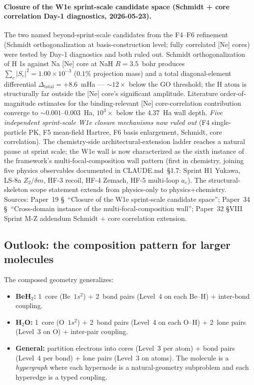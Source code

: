 \documentclass[aps,pra,twocolumn,superscriptaddress,longbibliography,floatfix]{revtex4-2}
\begin{document}
\paragraph{Closure of the W1e sprint-scale candidate space (Schmidt +
core correlation Day-1 diagnostics, 2026-05-23).} The two named
beyond-sprint-scale candidates from the F4--F6 refinement (Schmidt
orthogonalization at basis-construction level; fully correlated
[Ne] cores) were tested by Day-1 diagnostics and both ruled out.
Schmidt orthogonalization of H 1s against Na [Ne] core at NaH
$R = 3.5$~bohr produces $\sum_c |S_c|^2 = 1.00 \times 10^{-3}$
($0.1\%$ projection mass) and a total diagonal-element differential
$\Delta_\text{total} = +8.6$~mHa --- $\sim 12\times$ below the GO
threshold; the H atom is structurally far outside the [Ne] core's
significant amplitude. Literature order-of-magnitude estimates for
the binding-relevant [Ne] core-correlation contribution converge to
$\sim 0.001$--$0.003$~Ha, $10^3\times$ below the 4.37~Ha wall depth.
\emph{Five independent sprint-scale W1e closure mechanisms now ruled
out} (F4 single-particle PK, F5 mean-field Hartree, F6 basis
enlargement, Schmidt, core correlation). The chemistry-side
architectural-extension ladder reaches a natural pause at sprint
scale; the W1e wall is now characterized as the sixth instance of
the framework's multi-focal-composition wall pattern (first in
chemistry, joining five physics observables documented in
CLAUDE.md~\S1.7: Sprint H1 Yukawa, LS-8a $Z_2/\delta m$, HF-3 recoil,
HF-4 Zemach, HF-5 multi-loop $a_e$). The structural-skeleton scope
statement extends from physics-only to physics+chemistry. Sources:
Paper~19 \S~``Closure of the W1e sprint-scale candidate space'';
Paper~34 \S~``Cross-domain instance of the multi-focal-composition wall''; Paper~32
\S VIII Sprint M-Z addendum Schmidt + core correlation extension.

\subsection{Outlook: the composition pattern for larger molecules}
\label{sec:outlook}

The composed geometry generalizes:
\begin{itemize}
  \item \textbf{BeH$_2$:} 1~core (Be~$1s^2$) + 2~bond pairs (Level~4
    on each Be--H) + inter-bond coupling.
  \item \textbf{H$_2$O:} 1~core (O~$1s^2$) + 2~bond pairs (Level~4 on
    each O--H) + 2~lone pairs (Level~3 on O) + inter-pair coupling.
  \item \textbf{General:} partition electrons into cores (Level~3 per
    atom) + bond pairs (Level~4 per bond) + lone pairs (Level~3 on atoms).
    The molecule is a \emph{hypergraph} where each hypernode is a
    natural-geometry subproblem and each hyperedge is a typed coupling.
\end{itemize}
\end{document}

